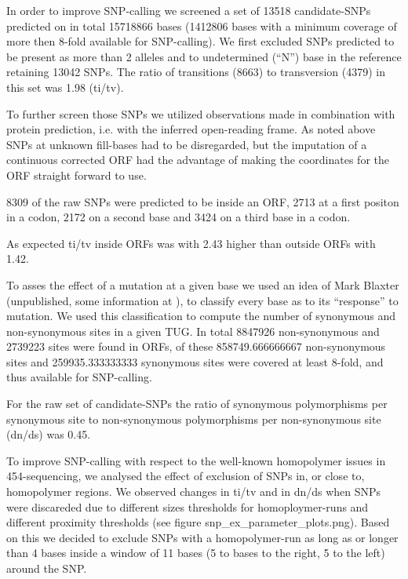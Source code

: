 \documentclass[10pt]{bmc_article}
\newenvironment{bmcformat}{\begin{raggedright}\baselineskip20pt\sloppy\setboolean{publ}{false}}{\end{raggedright}\baselineskip20pt\sloppy}
\begin{document}
\begin{bmcformat}











In order to improve SNP-calling we screened a set of 13518
candidate-SNPs predicted on in total 15718866 bases
(1412806 bases with a minimum coverage of more then 8-fold
available for SNP-calling). We first excluded SNPs predicted to be
present as more than 2 alleles and to undetermined (``N'') base in the
reference retaining 13042 SNPs. The ratio of transitions
(8663) to transversion (4379) in
this set was 1.98 (ti/tv).

To further screen those SNPs we utilized observations made in
combination with protein prediction, i.e. with the inferred
open-reading frame. As noted above SNPs at unknown fill-bases had to
be disregarded, but the imputation of a continuous corrected ORF had
the advantage of making the coordinates for the ORF straight forward
to use.

8309 of the raw SNPs were predicted to be inside
an ORF, 2713 at a first positon in a codon,
2172 on a second base and
3424 on a third base in a codon.

As expected ti/tv inside ORFs was with
2.43 higher than outside ORFs
with 1.42.

To asses the effect of a mutation at a given base we used an idea of
Mark Blaxter (unpublished, some information at \cite{Marks_ontology}),
to classify every base as to its ``response'' to mutation. We used
this classification to compute the number of synonymous and
non-synonymous sites in a given TUG. In total 8847926
non-synonymous and 2739223 sites were found in ORFs, of
these 858749.666666667 non-synonymous sites and
259935.333333333 synonymous sites were covered at least 8-fold,
and thus available for SNP-calling.

For the raw set of candidate-SNPs the ratio of synonymous
polymorphisms per synonymous site to non-synonymous polymorphisms per
non-synonymous site (dn/ds) was 0.45.

To improve SNP-calling with respect to the well-known homopolymer
issues in 454-sequencing\cite{pmid21685085}, we analysed the effect of
exclusion of SNPs in, or close to, homopolymer regions. We observed
changes in ti/tv and in dn/ds when SNPs were discareded due to
different sizes thresholds for homoploymer-runs and different
proximity thresholds (see figure snp\_ex\_parameter\_plots.png). Based
on this we decided to exclude SNPs with a homopolymer-run as long as
or longer than 4 bases inside a window of 11 bases (5 to bases to the
right, 5 to the left) around the SNP.


\end{bmcformat}
\end{document}
